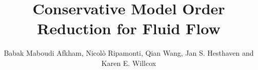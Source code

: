 \documentclass[graybox]{svmult}
\begin{document}
\title*{Conservative Model Order Reduction for Fluid Flow}
\author{Babak Maboudi Afkham, Nicol\`o Ripamonti, Qian Wang, Jan S. Hesthaven and Karen E. Willcox}
%
%
\maketitle


\end{document}
